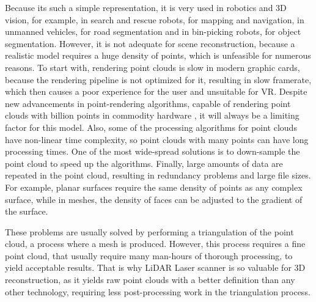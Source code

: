 Because its such a simple representation, it is very used in robotics and 3D vision, for example, in search and rescue robots, for mapping and navigation, in unmanned vehicles, for road segmentation and in bin-picking robots, for object segmentation. However, it is not adequate for scene reconstruction, because a realistic model requires a huge density of points, which is unfeasible for numerous reasons. To start with, rendering point clouds is slow in modern graphic cards, because the rendering pipeline is not optimized for it, resulting in slow framerate, which then causes a poor experience for the user and unsuitable for VR. Despite new advancements in point-rendering algorithms, capable of rendering point clouds with billion points in commodity hardware \cite{wimmer2006}, it will always be a limiting factor for this model. Also, some of the processing algorithms for point clouds have non-linear time complexity, so point clouds with many points can have long processing times. One of the most wide-spread solutions is to down-sample the point cloud to speed up the algorithms. Finally, large amounts of data are repeated in the point cloud, resulting in redundancy problems and large file sizes. For example, planar surfaces require the same density of points as any complex surface, while in meshes, the density of faces can be adjusted to the gradient of the surface.

These problems are usually solved by performing a triangulation of the point cloud, a process where a mesh is produced. However, this process requires a fine point cloud, that usually require many man-hours of thorough processing, to yield acceptable results. That is why LiDAR Laser scanner is so valuable for 3D reconstruction, as it yields raw point clouds with a better definition than any other technology, requiring less post-processing work in the triangulation process.
